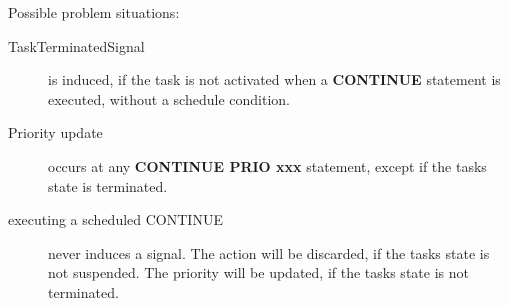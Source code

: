 \begin{added}
Possible problem situations:
\begin{description}
\item[TaskTerminatedSignal] is induced, if the task is not activated when 
a {\bf CONTINUE} statement is executed, without a schedule condition.
\item[Priority update] occurs at any {\bf CONTINUE PRIO xxx} statement,
 except if the tasks state is terminated.
\item[executing a scheduled CONTINUE] never induces a signal. The action will
   be discarded, if the tasks state is not suspended. The priority will be 
   updated, if the tasks state is not terminated.
\end{description}
\end{added}


